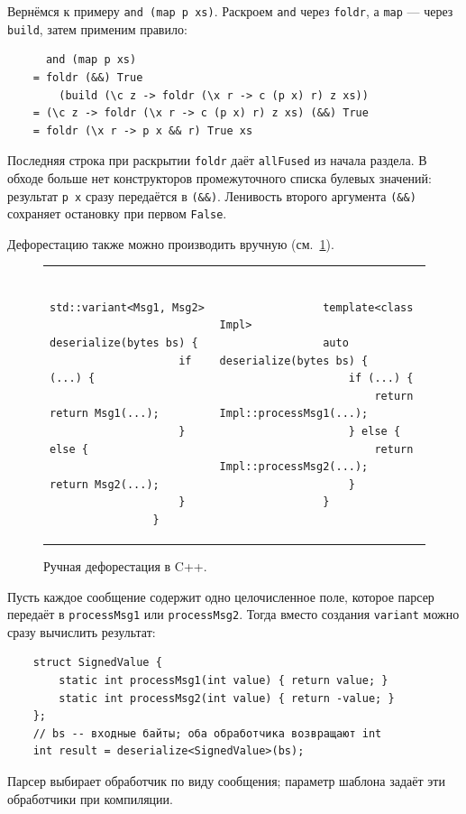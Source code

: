 Вернёмся к примеру \texttt{and (map p xs)}.
Раскроем \texttt{and} через \texttt{foldr}, а \texttt{map} --- через \texttt{build}, затем применим правило:
\begin{verbatim}
      and (map p xs)
    = foldr (&&) True
        (build (\c z -> foldr (\x r -> c (p x) r) z xs))
    = (\c z -> foldr (\x r -> c (p x) r) z xs) (&&) True
    = foldr (\x r -> p x && r) True xs
\end{verbatim}
Последняя строка при раскрытии \texttt{foldr} даёт \texttt{allFused} из начала раздела.
В обходе больше нет конструкторов промежуточного списка булевых значений: результат \texttt{p x} сразу передаётся в \texttt{(\&\&)}.
Ленивость второго аргумента \texttt{(\&\&)} сохраняет остановку при первом \texttt{False}.

Дефорестацию также можно производить вручную (см.~\ref{fig:cpp-deforestation}).
\begin{figure}
    \centering
    \begin{tabular}{@{}ll@{}}
        \begin{minipage}[t]{0.48\textwidth}
            \begin{verbatim}
                std::variant<Msg1, Msg2>
                    deserialize(bytes bs) {
                    if (...) {
                        return Msg1(...);
                    } else {
                        return Msg2(...);
                    }
                }
            \end{verbatim}
        \end{minipage}
        &
        \begin{minipage}[t]{0.48\textwidth}
            \begin{verbatim}
                template<class Impl>
                auto deserialize(bytes bs) {
                    if (...) {
                        return Impl::processMsg1(...);
                    } else {
                        return Impl::processMsg2(...);
                    }
                }
            \end{verbatim}
        \end{minipage}
    \end{tabular}
    \caption{Ручная дефорестация в C++.}
    \label{fig:cpp-deforestation}
\end{figure}
Пусть каждое сообщение содержит одно целочисленное поле, которое парсер передаёт в \texttt{processMsg1} или \texttt{processMsg2}.
Тогда вместо создания \texttt{variant} можно сразу вычислить результат:
\begin{verbatim}
    struct SignedValue {
        static int processMsg1(int value) { return value; }
        static int processMsg2(int value) { return -value; }
    };
    // bs -- входные байты; оба обработчика возвращают int
    int result = deserialize<SignedValue>(bs);
\end{verbatim}
Парсер выбирает обработчик по виду сообщения; параметр шаблона задаёт эти обработчики при компиляции.

